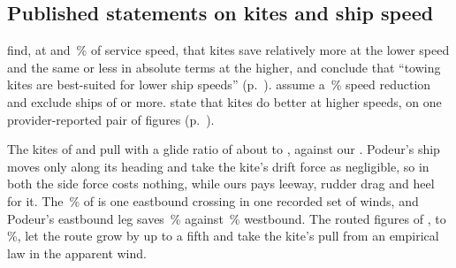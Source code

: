 \subsection{Published statements on kites and ship speed}
\label{app:speed_literature}

\citet{cedelft2016} find, at  and \,\% of service speed, that kites save relatively more at the lower speed and the same or less in absolute terms at the higher, and conclude that ``towing kites are best-suited for lower ship speeds'' (p.~). \citet{traut2014} assume a \,\% speed reduction and \citet{bentin2018} exclude ships of  or more. \citet{emsa2023} state that kites do better at higher speeds, on one provider-reported pair of figures (p.~).

The kites of \citet{podeur2016} and \citet{leloup2013} pull with a glide ratio of about  to , against our . Podeur's ship moves only along its heading and \citet{leloup2013} take the kite's drift force as negligible, so in both the side force costs nothing, while ours pays leeway, rudder drag and heel for it. The \,\% of \citet{leloup2013} is one eastbound crossing in one recorded set of winds, and Podeur's eastbound leg saves \,\% against \,\% westbound. The routed figures of \citet{bentin2018},  to \,\%, let the route grow by up to a fifth and take the kite's pull from an empirical law in the apparent wind.

